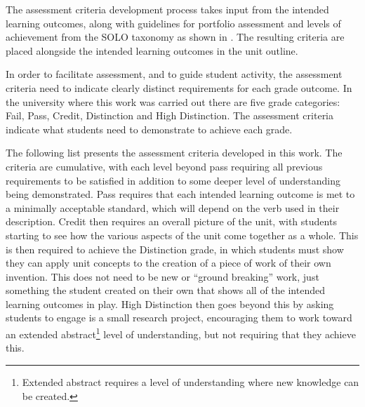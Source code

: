 The assessment criteria development process takes input from the intended learning outcomes, along with guidelines for portfolio assessment \cite{Biggs:2007} and levels of achievement from the SOLO taxonomy \cite{Biggs:1982} as shown in . The resulting criteria are placed alongside the intended learning outcomes in the unit outline.

In order to facilitate assessment, and to guide student activity, the assessment criteria need to indicate clearly distinct requirements for each grade outcome. In the university where this work was carried out there are five grade categories: Fail, Pass, Credit, Distinction and High Distinction. The assessment criteria indicate what students need to demonstrate to achieve each grade. 

The following list presents the assessment criteria developed in this work. The criteria are cumulative, with each level beyond pass requiring all previous requirements to be satisfied in addition to some deeper level of understanding being demonstrated. Pass requires that each intended learning outcome is met to a minimally acceptable standard, which will depend on the verb used in their description. Credit then requires an overall picture of the unit, with students starting to see how the various aspects of the unit come together as a whole. This is then required to achieve the Distinction grade, in which students must show they can apply unit concepts to the creation of a piece of work of their own invention. This does not need to be new or ``ground breaking'' work, just something the student created on their own that shows all of the intended learning outcomes in play. High Distinction then goes beyond this by asking students to engage is a small research project, encouraging them to work toward an extended abstract\footnote{Extended abstract requires a level of understanding where new knowledge can be created.} level of understanding, but not requiring that they achieve this.

